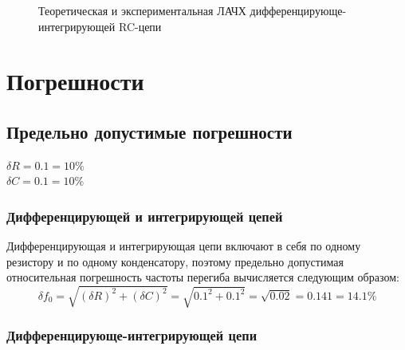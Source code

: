 \documentclass[a4paper,14pt]{extarticle}
\begin{document}
\begin{figure}[H]
\begin{center}
	\caption{Теоретическая и экспериментальная ЛАЧХ дифференцирующе-интегрирующей RC-цепи}
	\label{fig:diff-int}
\end{center}
\end{figure}

\section{Погрешности}

\subsection{Предельно допустимые погрешности}

\begin{center}
	$\delta R = 0.1 = 10\%$ \\
	$\delta C = 0.1 = 10\%$ \\
\end{center}

\subsubsection{Дифференцирующей и интегрирующей цепей}

Дифференцирующая и интегрирующая цепи включают в себя по одному резистору и по одному конденсатору, поэтому предельно допустимая относительная погрешность частоты перегиба вычисляется следующим образом:
\[
\delta f_0 = \sqrt{(\delta R)^2 + (\delta C)^2} = \sqrt{0.1^2 + 0.1^2} = \sqrt{0.02} = 0.141 = 14.1 \%
\]

\subsubsection{Дифференцирующе-интегрирующей цепи}
\end{document}
